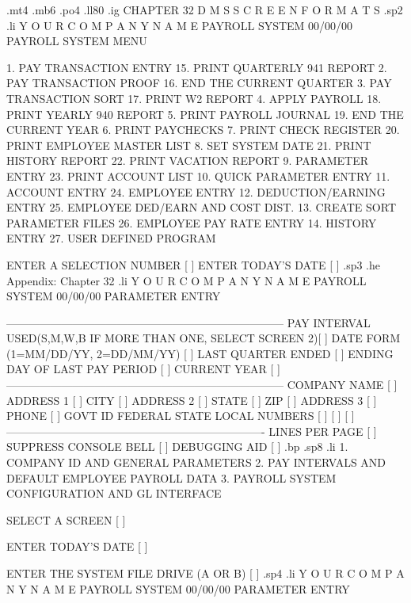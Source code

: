 .mt4
.mb6
.po4
.ll80
.ig
CHAPTER 32
D M S	S C R E E N    F O R M A T S
.sp2
.li
		Y O U R    C O M P A N Y    N A M E
			   PAYROLL SYSTEM
  00/00/00		PAYROLL SYSTEM MENU

   1.  PAY TRANSACTION ENTRY		15.  PRINT QUARTERLY 941 REPORT
   2.  PAY TRANSACTION PROOF		16.  END THE CURRENT QUARTER
   3.  PAY TRANSACTION SORT		17.  PRINT W2 REPORT
   4.  APPLY PAYROLL			18.  PRINT YEARLY 940 REPORT
   5.  PRINT PAYROLL JOURNAL		19.  END THE CURRENT YEAR
   6.  PRINT PAYCHECKS
   7.  PRINT CHECK REGISTER		20.  PRINT EMPLOYEE MASTER LIST
   8.  SET SYSTEM DATE			21.  PRINT HISTORY REPORT
					22.  PRINT VACATION REPORT
   9.  PARAMETER ENTRY			23.  PRINT ACCOUNT LIST
  10.  QUICK PARAMETER ENTRY
  11.  ACCOUNT ENTRY			24.  EMPLOYEE ENTRY
  12.  DEDUCTION/EARNING ENTRY		25.  EMPLOYEE DED/EARN AND COST DIST.
  13.  CREATE SORT PARAMETER FILES	26.  EMPLOYEE PAY RATE ENTRY
  14.  HISTORY ENTRY			27.  USER DEFINED PROGRAM

		    ENTER A SELECTION NUMBER [	]
		    ENTER TODAY'S DATE [        ]
.sp3
.he Appendix: Chapter 32
.li
		  Y O U R    C O M P A N Y    N A M E
			    PAYROLL SYSTEM
  00/00/00		    PARAMETER ENTRY

 ---------------------------------------------------------------------------
 PAY INTERVAL USED(S,M,W,B  IF MORE THAN ONE, SELECT SCREEN 2)[ 	   ]
 DATE FORM (1=MM/DD/YY, 2=DD/MM/YY)    [ ]	   LAST QUARTER ENDED	 [ ]
 ENDING DAY OF LAST PAY PERIOD	[	 ]		CURRENT YEAR	[  ]
 ---------------------------------------------------------------------------
 COMPANY
    NAME    [								 ]
    ADDRESS 1 [ 			     ]	CITY  [ 		 ]
    ADDRESS 2 [ 			     ]	STATE [  ]    ZIP  [	 ]
    ADDRESS 3 [ 			     ]	PHONE	   [		 ]
    GOVT ID	   FEDERAL		  STATE 	       LOCAL
    NUMBERS   [ 	      ]     [		    ]	 [		 ]
    ----------------------------------------------------------------------
    LINES PER PAGE  [  ]    SUPPRESS CONSOLE BELL [ ]	 DEBUGGING AID [ ]
.bp
.sp8
.li
		1. COMPANY ID AND GENERAL PARAMETERS
		2. PAY INTERVALS AND DEFAULT EMPLOYEE PAYROLL DATA
		3. PAYROLL SYSTEM CONFIGURATION AND GL INTERFACE

			    SELECT A SCREEN  [ ]

			ENTER TODAY'S DATE [        ]

		   ENTER THE SYSTEM FILE DRIVE	(A OR B) [ ]
.sp4
.li
		   Y O U R   C O M P A N Y    N A M E
			    PAYROLL SYSTEM
  00/00/00		    PARAMETER ENTRY

